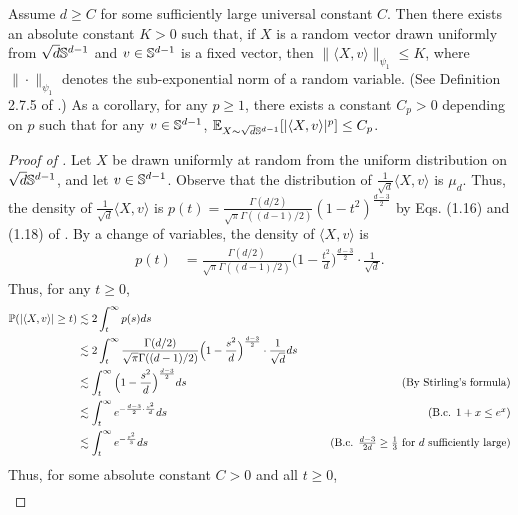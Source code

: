 \begin{lemma} \label{lemma:subexponential_norm_sphere}
Assume $d \geq C$ for some sufficiently large universal constant $C$. Then there exists an absolute constant $K > 0$ such that, if $X$ is a random vector drawn uniformly from $\sqrt{d} \mathbb{S}^{d - 1}$ and $v \in \mathbb{S}^{d - 1}$ is a fixed vector, then $\| \langle X, v \rangle \|_{\psi_1} \leq K$, where $\|\cdot \|_{\psi_1}$ denotes the sub-exponential norm of a random variable. (See Definition 2.7.5 of \citet{vershynin2018high}.) As a corollary, for any $p \geq 1$, there exists a constant $C_p > 0$ depending on $p$ such that for any $v \in \mathbb{S}^{d - 1}$, $\operatorname*{\mathbb{E}}_{X \sim \sqrt{d} \mathbb{S}^{d - 1}} [|\langle X, v \rangle|^p] \leq C_p$.
\end{lemma}
\begin{proof}[Proof of ]
Let $X$ be drawn uniformly at random from the uniform distribution on $\sqrt{d} \mathbb{S}^{d - 1}$, and let $v \in \mathbb{S}^{d - 1}$. Observe that the distribution of $\frac{1}{\sqrt{d}} \langle X, v \rangle$ is $\mu_d$. Thus, the density of $\frac{1}{\sqrt{d}} \langle X, v \rangle$ is $p(t) = \frac{\Gamma(d/2)}{\sqrt{\pi} \Gamma((d - 1)/2)} (1 - t^2)^{\frac{d - 3}{2}}$ by Eqs. (1.16) and (1.18) of \citet{atkinson2012spherical}. By a change of variables, the density of $\langle X, v \rangle$ is
\begin{align}
p(t)
& = \frac{\Gamma(d/2)}{\sqrt{\pi} \Gamma((d - 1)/2)} \Big(1 - \frac{t^2}{d}\Big)^{\frac{d - 3}{2}} \cdot \frac{1}{\sqrt{d}}.
\end{align}
Thus, for any $t \geq 0$,
\begin{align}
\Prob(|\langle X, v \rangle| \geq t)
& \lesssim 2 \int_t^\infty p(s) ds \\
& \lesssim 2 \int_t^\infty \frac{\Gamma(d/2)}{\sqrt{\pi} \Gamma((d - 1)/2)} \Big(1 - \frac{s^2}{d}\Big)^{\frac{d - 3}{2}} \cdot \frac{1}{\sqrt{d}} ds \\
& \lesssim \int_t^\infty \Big(1 - \frac{s^2}{d}\Big)^{\frac{d - 3}{2}} ds
& \tag{By Stirling's formula} \\
& \lesssim \int_t^\infty e^{-\frac{d - 3}{2} \cdot \frac{s^2}{d}} ds
& \tag{B.c. $1 + x \leq e^{x}$} \\
& \lesssim \int_t^\infty e^{-\frac{s^2}{3}} ds
& \tag{B.c. $\frac{d - 3}{2d} \geq \frac{1}{3}$ for $d$ sufficiently large}
\end{align}
Thus, for some absolute constant $C > 0$ and all $t \geq 0$,
\begin{align}

\end{align}
\end{proof}
